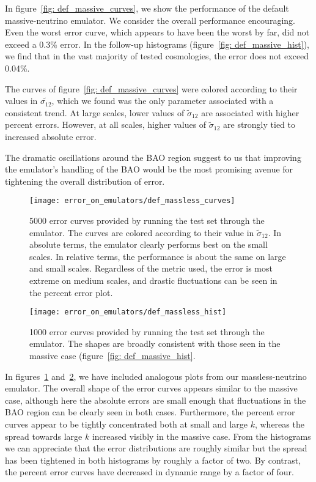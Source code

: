 In figure~\ref{fig: def_massive_curves}, we 
show the performance of the default massive-neutrino emulator. We consider
the overall performance encouraging. Even the worst error curve, which
appears to have been the worst by far, did not exceed a 0.3\% error.
In the follow-up histograms (figure~\ref{fig: def_massive_hist}), we find
that in the vast majority of tested cosmologies, the error does not
exceed 0.04\%.

The curves of figure~\ref{fig: def_massive_curves} were colored according to
their values in $\tilde{\sigma_{12}}$, which we found was the only parameter
associated with a consistent trend. At large scales, lower values of
$\tilde{\sigma}_{12}$ are associated with higher percent errors. However, at
all scales, higher values of $\tilde{\sigma}_{12}$ are strongly tied to
increased absolute error.

The dramatic
oscillations around the BAO region suggest to us that improving the emulator's
handling of the BAO would be the most promising avenue for tightening the
overall distribution of error.

\begin{figure}[ht!]
  \centering
  \texttt{[image: error\_on\_emulators/def\_massless\_curves]}
  \caption[Default Massless Emulator Error Curves]{5000 error curves provided 
  by running the test set through the emulator. The curves are colored
  according to their value in $\tilde{\sigma}_{12}$.
  In absolute terms, the emulator
  clearly performs best on the small scales. In relative terms, the
  performance is about the same on large and small scales.
  Regardless of the metric used, the
  error is most extreme on medium scales, and drastic fluctuations can be seen 
  in the percent error plot.}
  \label{fig: def_massless_curves}
\end{figure}

\begin{figure}[ht!]
  \centering
  \texttt{[image: error\_on\_emulators/def\_massless\_hist]}
  \caption[Default Massless Emulator Error Histograms]{1000 error curves 
  	provided by running the test set through the emulator. The shapes
  	are broadly consistent with those seen in the massive case
  	(figure~\ref{fig: def_massive_hist}.}
  \label{fig: def_massless_hist}
\end{figure}

In figures~\ref{fig: def_massless_curves} and~\ref{fig: def_massless_hist},
we have included analogous plots from our massless-neutrino emulator.
The overall shape of the error curves appears similar to the massive
case, although here the absolute errors are small enough that fluctuations
in the BAO region can be clearly seen in both cases. Furthermore, the
percent error curves appear to be tightly concentrated both at small and
large $k$, whereas the spread towards large $k$ increased visibly
in the massive case. From the histograms we can appreciate that the error
distributions are roughly similar but the spread has been tightened in both
histograms by roughly a factor of two. By contrast, the percent error
curves have decreased in dynamic range by a factor of four.


